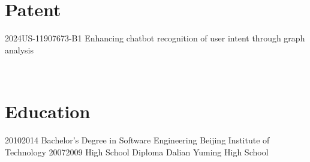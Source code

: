 \documentclass[]{lubricy-cv}
\begin{document}
\section{Patent}
\begin{entrylist}
  \entry
    {2024}{US-11907673-B1}
    {Enhancing chatbot recognition of user intent through graph analysis}
    {}
    {} {}
\end{entrylist}
~
\section{Education}
\begin{entrylist}
  \entry
    {2010}{2014}
    {Bachelor's Degree in Software Engineering}
    {Beijing Institute of Technology}
    {} {}
  \entry
    {2007}{2009}
    {High School Diploma}
    {Dalian Yuming High School}
    {} {}
\end{entrylist}
\end{document}
